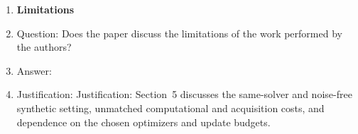 \begin{enumerate}
\item {\bf Limitations}
    \item[] Question: Does the paper discuss the limitations of the work performed by the authors?
    \item[] Answer: \answerYes{}
    \item[] Justification: Justification: Section~5 discusses the same-solver and noise-free synthetic
setting, unmatched computational and acquisition costs, and dependence on the
chosen optimizers and update budgets.


\end{enumerate}
